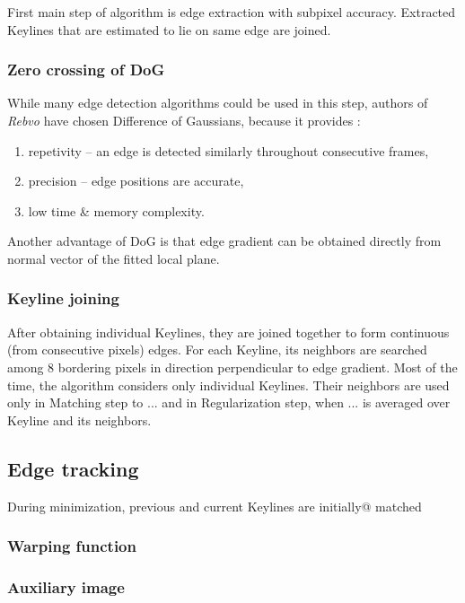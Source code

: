 First main step of algorithm is edge extraction with subpixel accuracy. Extracted Keylines that are estimated to lie on same edge are joined.

\subsubsection{Zero crossing of DoG}
While many edge detection algorithms could be used in this step, authors of \textit{Rebvo} have chosen Difference of Gaussians, because it provides \cite{jose2015realtime}:
\begin{enumerate}
	\item repetivity -- an edge is detected similarly throughout consecutive frames,
	\item precision -- edge positions are accurate,
	\item low time \& memory complexity.
\end{enumerate}

Another advantage of DoG is that edge gradient can be obtained directly from normal vector of the fitted local plane.

\subsubsection{Keyline joining}

After obtaining individual Keylines, they are joined together to form continuous (from consecutive pixels) edges. %
For each Keyline, its neighbors are searched among 8 bordering pixels in direction perpendicular to edge gradient.
Most of the time, the algorithm considers only individual Keylines. Their neighbors are used only in Matching step to ... %
and in Regularization step, when ... %
is averaged over Keyline and its neighbors.



\subsection{Edge tracking}

During minimization, previous and current Keylines are initially@ matched

\subsubsection{Warping function}

\subsubsection{Auxiliary image}

